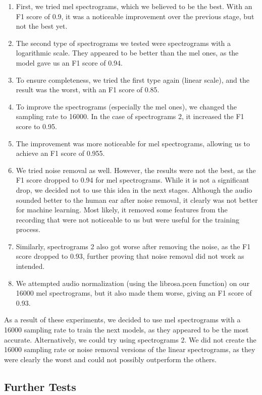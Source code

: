 \documentclass[11pt, letterpaper]{article}
\begin{document}
\begin{enumerate}
    \item First, we tried mel spectrograms, which we believed to be the best. With an F1 score of 0.9, it was a noticeable improvement over the previous stage, but not the best yet.
    \item The second type of spectrograms we tested were spectrograms with a logarithmic scale. They appeared to be better than the mel ones, as the model gave us an F1 score of 0.94.
    \item To ensure completeness, we tried the first type again (linear scale), and the result was the worst, with an F1 score of 0.85.
    \item To improve the spectrograms (especially the mel ones), we changed the sampling rate to 16000. In the case of spectrograms 2, it increased the F1 score to 0.95.
    \item The improvement was more noticeable for mel spectrograms, allowing us to achieve an F1 score of 0.955.
    \item We tried noise removal as well. However, the results were not the best, as the F1 score dropped to 0.94 for mel spectrograms. While it is not a significant drop, we decided not to use this idea in the next stages. Although the audio sounded better to the human ear after noise removal, it clearly was not better for machine learning. Most likely, it removed some features from the recording that were not noticeable to us but were useful for the training process.
    \item Similarly, spectrograms 2 also got worse after removing the noise, as the F1 score dropped to 0.93, further proving that noise removal did not work as intended.
    \item We attempted audio normalization (using the librosa.pcen function) on our 16000 mel spectrograms, but it also made them worse, giving an F1 score of 0.93.
\end{enumerate}

As a result of these experiments, we decided to use mel spectrograms with a 16000 sampling rate to train the next models, as they appeared to be the most accurate. Alternatively, we could try using spectrograms 2. We did not create the 16000 sampling rate or noise removal versions of the linear spectrograms, as they were clearly the worst and could not possibly outperform the others.

\subsection{Further Tests}
\end{document}
